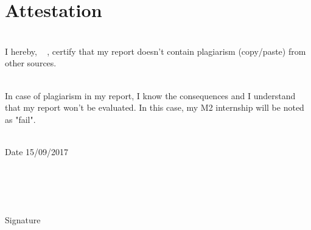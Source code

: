 \chapter*{Attestation}

\vfill

\noindent\hrulefill

~\\
I hereby,  \FirstName~  \LastName, certify that my report doesn't contain plagiarism (copy/paste) from other sources.

~\\
In case of plagiarism in my report, I know the consequences and I understand that my report won't be evaluated. In this case, my M2 internship will be noted as "fail".

~\\

Date 15/09/2017

~\\
~\\ 
~\\
~\\
 
 Signature
 \FirstName~  \LastName
 
~\\

\noindent\hrulefill

\vfill

\vfill